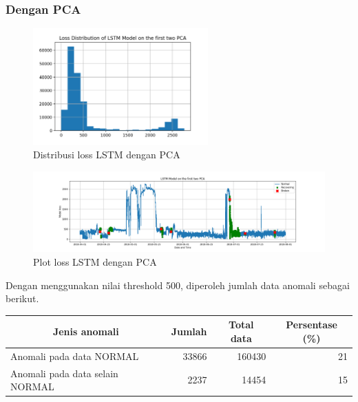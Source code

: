     \subsubsection{Dengan PCA}

    \begin{figure}[h]
        \centering
        \includegraphics[width=0.6\textwidth]{resources/LSTM/LSTM_PCA_LossDist.png}
        \caption{Distribusi loss LSTM dengan PCA}
    \end{figure}

    \begin{figure}[h]
        \centerline{\includegraphics[width=1.4\textwidth]{resources/LSTM/LSTM_PCA_model_loss.png}}
        \caption{Plot loss LSTM dengan PCA}
    \end{figure}

    Dengan menggunakan nilai threshold 500, diperoleh jumlah data anomali sebagai berikut.

    \begin{table}[h]
        \centering
        \begin{tabular}{|l|r|r|r|}
            \hline
            \multicolumn{1}{|c|}{\textbf{Jenis anomali}} & \multicolumn{1}{c|}{\textbf{Jumlah}} & \multicolumn{1}{c|}{\textbf{Total data}} & \multicolumn{1}{c|}{\textbf{Persentase (\%)}} \\ \hline
            Anomali pada data NORMAL                     & 33866                                & 160430                                   & 21                                       \\ \hline
            Anomali pada data selain NORMAL              & 2237                                 & 14454                                    & 15                                       \\ \hline
        \end{tabular}
    \end{table}

